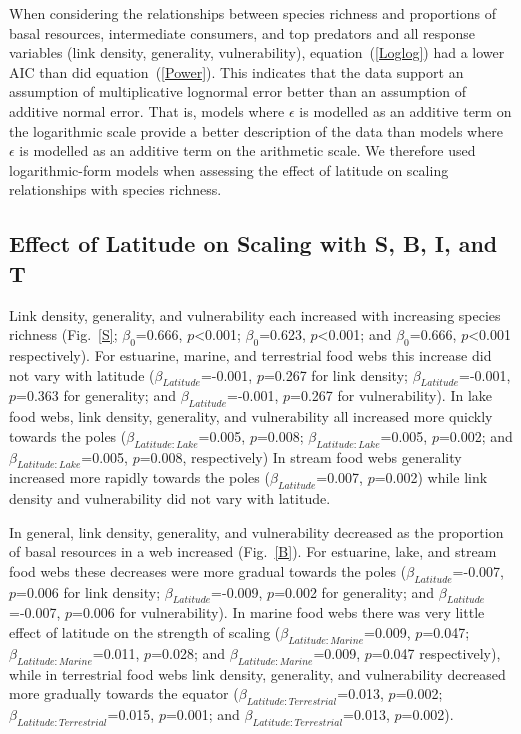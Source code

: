 \documentclass[12pt]{article}
\begin{document}
  When considering the relationships between species richness and proportions 
  of basal resources, intermediate consumers, and top predators and all response variables 
  (link density, generality, vulnerability), equation~(\ref{Loglog}) had a
  lower AIC than did equation~(\ref{Power}). This indicates that the
  data support an assumption of multiplicative lognormal error better than an
  assumption of additive normal error. That is, models where $\epsilon$ is
  modelled as an additive term on
  the logarithmic scale provide a better description of the data than models
  where $\epsilon$ is modelled as an additive term on the arithmetic scale.  
  We therefore used logarithmic-form models when assessing the
  effect of latitude on scaling relationships  with species richness.



\subsection*{Effect of Latitude on Scaling with S, B, I, and T}

Link density, generality, and vulnerability each increased with increasing
species richness (Fig.~\ref{S}; $\beta_0$=0.666, $p$\textless0.001; $\beta_0$=0.623,
$p$\textless0.001; and $\beta_0$=0.666, $p$\textless0.001 respectively).  For estuarine,
marine, and terrestrial food webs this increase did not vary with latitude
($\beta_{Latitude}$=-0.001, $p$=0.267 for link density; $\beta_{Latitude}$=-0.001, $p$=0.363 for generality;
and $\beta_{Latitude}$=-0.001, $p$=0.267 for vulnerability). In lake food webs, link density,
generality, and vulnerability all increased more quickly towards the poles
($\beta_{Latitude:Lake}$=0.005, $p$=0.008; $\beta_{Latitude:Lake}$=0.005,
$p$=0.002; and $\beta_{Latitude:Lake}$=0.005, $p$=0.008, respectively) In
stream food webs generality increased more rapidly towards the poles 
($\beta_{Latitude}$=0.007, $p$=0.002) while link density and vulnerability did not vary with latitude.


In general, link density, generality, and vulnerability decreased as the
proportion of basal resources in a web increased (Fig.~\ref{B}). For
estuarine, lake, and stream food webs these decreases were more gradual towards the
poles ($\beta_{Latitude}$=-0.007, $p$=0.006 for link density;
$\beta_{Latitude}$=-0.009, $p$=0.002 for generality; and
$\beta_{Latitude}$=-0.007, $p$=0.006 for vulnerability).
In marine food webs there was very little effect of latitude on
the strength of scaling ($\beta_{Latitude:Marine}$=0.009, $p$=0.047; 
$\beta_{Latitude:Marine}$=0.011, $p$=0.028; 
and $\beta_{Latitude:Marine}$=0.009, $p$=0.047 respectively),
while in terrestrial food webs link density, generality, and vulnerability
decreased more gradually towards the 
equator ($\beta_{Latitude:Terrestrial}$=0.013, $p$=0.002; 
$\beta_{Latitude:Terrestrial}$=0.015, $p$=0.001; 
and $\beta_{Latitude:Terrestrial}$=0.013, $p$=0.002).
\end{document}
